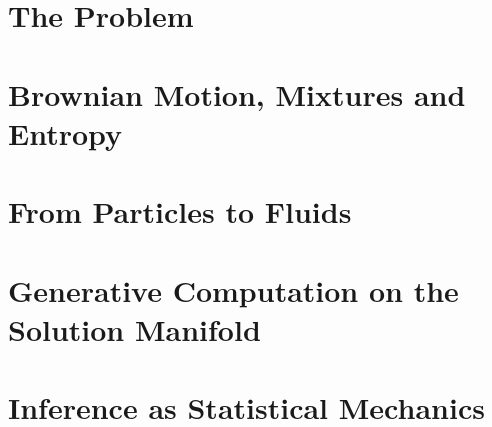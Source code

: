 \documentclass[11pt,twoside,openright]{book}
\makeatletter
\def\cleardoublepage{\clearpage\if@twoside \ifodd\c@page\else
  \hbox{}\thispagestyle{empty}\newpage\if@twocolumn\hbox{}\newpage\fi\fi\fi}
\theoremstyle{scplain}
\theoremstyle{scdef}
\makeatother
\begin{document}
\pagestyle{fancy}
\tableofcontents
\cleardoublepage



\mainmatter
\part{The Problem}\label{part:problem}






\part{Brownian Motion, Mixtures and Entropy}\label{part:brownian}





\part{From Particles to Fluids}\label{part:fluids}





\part{Generative Computation on the Solution Manifold}\label{part:manifold}





\part{Inference as Statistical Mechanics}\label{part:statmech}






\appendix






\backmatter
\raggedright


\clearpage
\ifodd\ReadonlyShipoutCounter\thispagestyle{empty}\null\clearpage\fi
\end{document}
